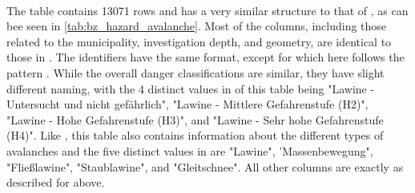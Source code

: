 \paragraph{}
The table  contains 13071 rows and has a very similar structure to that of , as can bee seen in \cref{tab:bz_hazard_avalanche}. Most of the columns, including those related to the municipality, investigation depth, and geometry, are identical to those in . The identifiers have the same format, except for  which here follows the pattern .
While the overall danger classifications are similar, they have slight different naming, with the 4 distinct values in  of this table being "Lawine - Untersucht und nicht gefährlich", "Lawine - Mittlere Gefahrenstufe (H2)", "Lawine - Hohe Gefahrenstufe (H3)", and "Lawine - Sehr hohe Gefahrenstufe (H4)".
Like , this table also contains information about the different types of avalanches and the five distinct values in  are "Lawine", 'Massenbewegung", "Fließlawine", "Staublawine", and "Gleitschnee".
All other columns are exactly as described for  above.


\subsubsection{\texorpdfstring{}{bz\_admin\_municipality}}

